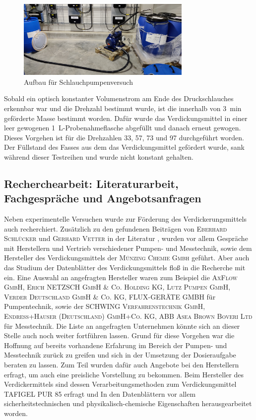 \begin{figure}[h!]
	\centering
	\includegraphics[width=0.75\textwidth]{img/pumpenversuch}
	\caption{Aufbau für Schlauchpumpenversuch}
	\label{fig:pumpentest}
\end{figure}
\FloatBarrier

Sobald ein optisch konstanter Volumenstrom am Ende des Druckschlauches erkennbar war und die Drehzahl bestimmt wurde, ist die innerhalb von \SI{3}{\minute} geförderte Masse bestimmt worden. Dafür wurde das Verdickungsmittel in einer leer gewogenen \SI{1}{\liter}-Probenahmeflasche abgefüllt und danach erneut gewogen. Dieses Vorgehen ist für die Drehzahlen 33, 57, 73 und \SI{97}{\rpm} durchgeführt worden. Der Füllstand des Fasses aus dem das Verdickungsmittel gefördert wurde, sank während dieser Testreihen und wurde nicht konstant gehalten. 

\subsection{Recherchearbeit: Literaturarbeit, Fachgespräche und Angebotsanfragen}
Neben experimentelle Versuchen wurde zur Förderung des Verdickerungsmittels auch recherchiert. Zusätzlich zu den gefundenen Beiträgen von \textsc{Eberhard Schlücker} und \textsc{Gerhard Vetter} in der Literatur \cite{Vetter.2002}, wurden vor allem Gespräche mit Herstellern und Vertrieb verschiedener Pumpen- und Messtechnik, sowie dem Hersteller des Verdickungsmittels der \textsc{Münzing Chemie Gmbh} geführt. Aber auch das Studium der Datenblätter des Verdickungsmittels floß in die Recherche mit ein. \linebreak 
Eine Auswahl an angefragten Hersteller waren zum Beispiel die \textsc{AxFlow GmbH, Erich NETZSCH GmbH \& Co. Holding KG, Lutz Pumpen GmbH, Verder Deutschland GmbH \& Co. KG, FLUX-GERÄTE GMBH} für Pumpentechnik, sowie der \textsc{SCHWING Verfahrenstechnik GmbH, Endress+Hauser (Deutschland) GmbH+Co. KG, ABB Asea Brown Boveri Ltd} für Messtechnik. Die Liste an angefragten Unternehmen könnte sich an dieser Stelle auch noch weiter fortführen lassen. Grund für diese Vorgehen war die Hoffnung auf bereits vorhandene Erfahrung im Bereich der Pumpen- und Messtechnik zurück zu greifen und sich in der Umsetzung der Dosieraufgabe beraten zu lassen. Zum Teil wurden dafür auch Angebote bei den Herstellern erfragt, um auch eine preisliche Vorstellung zu bekommen. \linebreak
Beim Hersteller des Verdickermittels sind dessen Verarbeitungsmethoden zum Verdickungsmittel TAFIGEL PUR 85 erfragt und In den Datenblättern vor allem sicherheitstechnischen und physikalisch-chemische Eigenschaften herausgearbeitet worden.

